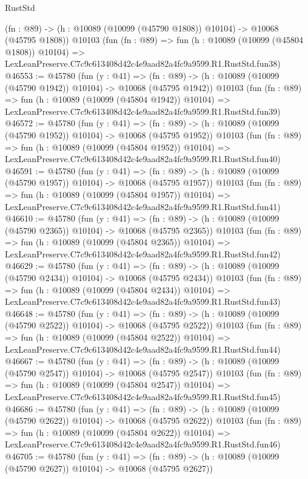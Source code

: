 \begin{lexlean}{RustStd}
\begin{coremodule}
    (fn : @89) -> (h : @10089 (@10099 (@45790 @1808)) @10104) -> @10068 (@45795 @1808))
    @10103
    (fun (fn : @89) =>
    fun (h : @10089 (@10099 (@45804 @1808)) @10104) =>
    LexLeanPreserve.C7c9c613408d42c4e9aad82a4fc9a9599.R1.RustStd.fun38)
@46553 := @45780
    (fun (y : @41) =>
    (fn : @89) -> (h : @10089 (@10099 (@45790 @1942)) @10104) -> @10068 (@45795 @1942))
    @10103
    (fun (fn : @89) =>
    fun (h : @10089 (@10099 (@45804 @1942)) @10104) =>
    LexLeanPreserve.C7c9c613408d42c4e9aad82a4fc9a9599.R1.RustStd.fun39)
@46572 := @45780
    (fun (y : @41) =>
    (fn : @89) -> (h : @10089 (@10099 (@45790 @1952)) @10104) -> @10068 (@45795 @1952))
    @10103
    (fun (fn : @89) =>
    fun (h : @10089 (@10099 (@45804 @1952)) @10104) =>
    LexLeanPreserve.C7c9c613408d42c4e9aad82a4fc9a9599.R1.RustStd.fun40)
@46591 := @45780
    (fun (y : @41) =>
    (fn : @89) -> (h : @10089 (@10099 (@45790 @1957)) @10104) -> @10068 (@45795 @1957))
    @10103
    (fun (fn : @89) =>
    fun (h : @10089 (@10099 (@45804 @1957)) @10104) =>
    LexLeanPreserve.C7c9c613408d42c4e9aad82a4fc9a9599.R1.RustStd.fun41)
@46610 := @45780
    (fun (y : @41) =>
    (fn : @89) -> (h : @10089 (@10099 (@45790 @2365)) @10104) -> @10068 (@45795 @2365))
    @10103
    (fun (fn : @89) =>
    fun (h : @10089 (@10099 (@45804 @2365)) @10104) =>
    LexLeanPreserve.C7c9c613408d42c4e9aad82a4fc9a9599.R1.RustStd.fun42)
@46629 := @45780
    (fun (y : @41) =>
    (fn : @89) -> (h : @10089 (@10099 (@45790 @2434)) @10104) -> @10068 (@45795 @2434))
    @10103
    (fun (fn : @89) =>
    fun (h : @10089 (@10099 (@45804 @2434)) @10104) =>
    LexLeanPreserve.C7c9c613408d42c4e9aad82a4fc9a9599.R1.RustStd.fun43)
@46648 := @45780
    (fun (y : @41) =>
    (fn : @89) -> (h : @10089 (@10099 (@45790 @2522)) @10104) -> @10068 (@45795 @2522))
    @10103
    (fun (fn : @89) =>
    fun (h : @10089 (@10099 (@45804 @2522)) @10104) =>
    LexLeanPreserve.C7c9c613408d42c4e9aad82a4fc9a9599.R1.RustStd.fun44)
@46667 := @45780
    (fun (y : @41) =>
    (fn : @89) -> (h : @10089 (@10099 (@45790 @2547)) @10104) -> @10068 (@45795 @2547))
    @10103
    (fun (fn : @89) =>
    fun (h : @10089 (@10099 (@45804 @2547)) @10104) =>
    LexLeanPreserve.C7c9c613408d42c4e9aad82a4fc9a9599.R1.RustStd.fun45)
@46686 := @45780
    (fun (y : @41) =>
    (fn : @89) -> (h : @10089 (@10099 (@45790 @2622)) @10104) -> @10068 (@45795 @2622))
    @10103
    (fun (fn : @89) =>
    fun (h : @10089 (@10099 (@45804 @2622)) @10104) =>
    LexLeanPreserve.C7c9c613408d42c4e9aad82a4fc9a9599.R1.RustStd.fun46)
@46705 := @45780
    (fun (y : @41) =>
    (fn : @89) -> (h : @10089 (@10099 (@45790 @2627)) @10104) -> @10068 (@45795 @2627))

\end{coremodule}
\end{lexlean}
